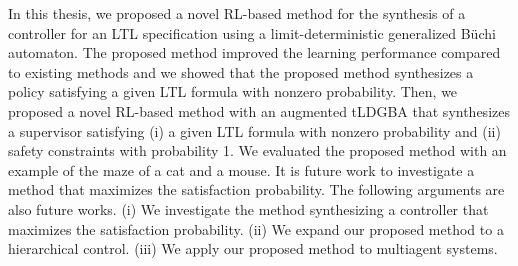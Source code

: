 In this thesis, we proposed a novel RL-based method for the synthesis of a controller for an LTL specification using a limit-deterministic generalized B\"{u}chi automaton.
The proposed method improved the learning performance compared to existing methods and we showed that the proposed method synthesizes a policy satisfying a given LTL formula with nonzero probability.
Then, we proposed a novel RL-based method with an augmented tLDGBA that synthesizes a supervisor satisfying (i) a given LTL formula with nonzero probability and (ii) safety constraints with probability 1.  We evaluated the proposed method with an example of the maze of a cat and a mouse.
It is future work to investigate a method that maximizes the satisfaction probability. The following arguments are also future works. (i) We investigate the method synthesizing a controller that maximizes the satisfaction probability. (ii) We expand our proposed method to a hierarchical control. (iii) We apply our proposed method to multiagent systems.
